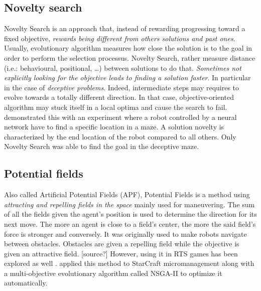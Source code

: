 \subsection{Novelty search}\label{subsec:novelty-search}

Novelty Search is an approach that, instead of rewarding progressing toward a
fixed objective, \emph{rewards being different from others solutions and past ones}.
Usually, evolutionary algorithm measures how close the solution is to the goal
in order to perform the selection processus. Novelty Search, rather measure
distance (i.e.: behavioural, positional, …) between solutions to do that.
\emph{Sometimes not explicitly looking for the objective
leads to finding a solution faster}.
In particular in the case of \emph{deceptive problems}. Indeed, intermediate steps
may requires to evolve towards a totally different direction.
In that case, objective-oriented algorithm may stuck itself
in a local optima and cause the search to fail.
\citet{LeSt11} demonstrated this with an experiment where a robot controlled by a
neural network have to find a specific location in a maze.
A solution novelty is characterized by the end location of the robot
compared to all others. Only Novelty Search was able
to find the goal in the deceptive maze.

\subsection{Potential fields}\label{subsec:potential-fields}

Also called Artificial Potential Fields (APF), Potential Fields is a method
using \emph{attracting and repelling fields in the space} mainly used for maneuvering.
The sum of all the fields given the agent's position is used to determine the
direction for its next move. The more an agent is close to a field's center,
the more the said field's force is stronger and conversely.
It was originally used to make robots navigate between obstacles. Obstacles are
given a repelling field while the objective is given an attractive field. [source?]
However, using it in RTS games has been explored as well \cite{HaJo08}.
\citet{BoAu12} applied this method to StarCraft micromanagement along with
a multi-objective evolutionary algorithm called NSGA-II to optimize it automatically.

